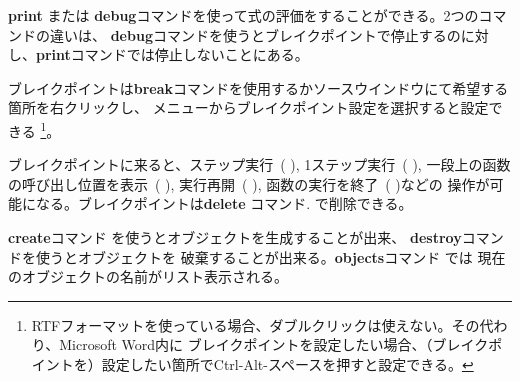 \documentclass[\pformat,12pt]{jarticle}
\newcommand{\guicmd}[1]{{\gt #1}}
\begin{document}
\textbf{print} または
\textbf{debug}コマンドを使って式の評価をすることができる。2つのコマンドの違いは、
{\bf debug}コマンドを使うとブレイクポイントで停止するのに対し、{\bf print}コマンドでは停止しないことにある。

ブレイクポイントは\textbf{break}コマンドを使用するか\guicmd{ソース}ウインドウにて希望する箇所を右クリックし、
メニューから\guicmd{ブレイクポイント設定}を選択すると設定できる
\footnote{RTFフォーマットを使っている場合、ダブルクリックは使えない。その代わり、Microsoft Word内に
ブレイクポイントを設定したい場合、（ブレイクポイントを）設定したい箇所でCtrl-Alt-スペースを押すと設定できる。}。

ブレイクポイントに来ると、\guicmd{ステップ実行}~(\hspace{-1.8mm}
),
\guicmd{1ステップ実行}~(\hspace{-1.8mm} 
),
\guicmd{一段上の函数の呼び出し位置を表示}~(\hspace{-1.8mm}
),
\guicmd{実行再開}~(\hspace{-1.8mm}
),
\guicmd{函数の実行を終了}~(\hspace{-1.8mm} 
)などの
操作が可能になる。ブレイクポイントは\textbf{delete} コマンド.
で削除できる。

\textbf{create}コマンド を使うとオブジェクトを生成することが出来、
\textbf{destroy}コマンドを使うとオブジェクトを
破棄することが出来る。\textbf{objects}コマンド では
現在のオブジェクトの名前がリスト表示される。
\end{document}
